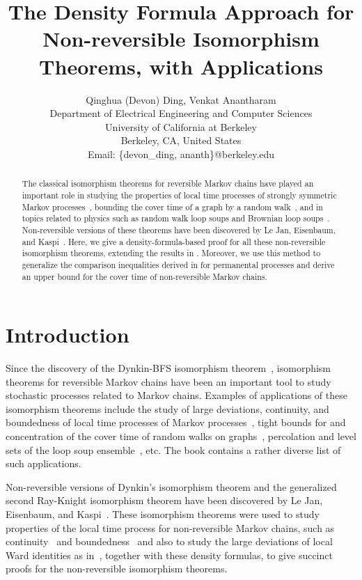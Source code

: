 \documentclass[a4paper, 11pt]{article}
\title{The Density Formula Approach for Non-reversible Isomorphism Theorems, with Applications}
\author{Qinghua (Devon) Ding, \quad Venkat Anantharam\\
  Department of Electrical Engineering and Computer Sciences\\
                    University of California at Berkeley\\
                    Berkeley, CA, United States\\
Email: \{devon\_ding, ananth\}@berkeley.edu}
\begin{document}
\maketitle

\begin{abstract}
The classical isomorphism theorems for reversible Markov chains have played an important role in studying the properties of local time processes of strongly symmetric Markov processes~\cite{mr06}, bounding the cover time of a graph by a random walk~\cite{dlp11}, and in topics related to physics such as random walk loop soups and Brownian loop soups~\cite{lt07}. Non-reversible versions of these theorems have been discovered by Le Jan, Eisenbaum, and Kaspi~\cite{lejan08, ek09, eisenbaum13}. Here, we give a density-formula-based proof for all these non-reversible isomorphism theorems, extending the results in \cite{bhs21}. Moreover, we use this method to generalize the comparison inequalities derived in \cite{eisenbaum13} for permanental processes and derive an upper bound for the cover time of non-reversible Markov chains.
\end{abstract}

\section{Introduction}

Since the discovery of the Dynkin-BFS isomorphism theorem~\cite{dynkin84, bfs82}, isomorphism theorems for reversible Markov chains have been an important tool to study stochastic processes related to Markov chains. Examples of applications of these isomorphism theorems include the study of large deviations, continuity, and boundedness of local time processes of Markov processes~\cite{ek09, mr06}, tight bounds for and concentration of the cover time of
random walks on graphs~\cite{dlp11, zhai18}, percolation and level sets of the loop soup ensemble~\cite{lupu16}, etc. The book \cite{mr06} contains a rather diverse list of such applications.

Non-reversible versions of Dynkin's isomorphism theorem and the generalized second Ray-Knight isomorphism theorem have been discovered by Le Jan, Eisenbaum, and Kaspi~\cite{lejan08,ek09, eisenbaum13}. These isomorphism theorems were used to study properties of the local time process for non-reversible Markov chains, such as continuity~\cite{mr13} and boundedness~\cite{mr17} and also to study the large deviations of local %
Ward identities as in~\cite{bhs21},
together with these density formulas, to give succinct proofs for the non-reversible isomorphism theorems.
\end{document}
